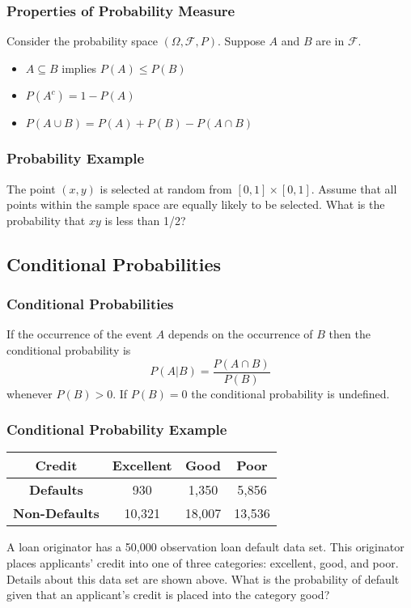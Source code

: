 \documentclass{beamer}
\begin{document}
\begin{frame}
\frametitle{Properties of Probability Measure}
Consider the probability space $(\Omega, \mathcal{F}, P)$. Suppose $A$ and $B$ are in $\mathcal{F}$.
\begin{itemize}
\item $A \subseteq B$ implies $P(A) \leq P(B)$
\item $P(A^c) = 1 - P(A)$
\item $P(A\cup B) = P(A) + P(B) - P(A\cap B)$
\end{itemize}
\end{frame}

\begin{frame}[t]
\frametitle{Probability Example}
\small
\begin{Example}
The point $(x, y)$ is selected at random from $[0, 1]\times [0, 1]$. Assume that all points within the sample space are equally likely to be selected. What is the probability that $xy$ is less than 1/2?
\end{Example}


\end{frame}

\subsection{Conditional Probabilities}

\begin{frame}
\frametitle{Conditional Probabilities}
\begin{Definition}
If the occurrence of the event $A$ depends on the occurrence of $B$ then the conditional probability is
$$
P(A | B) = \frac{P(A\cap B)}{P(B)}
$$
whenever $P(B) > 0$. If $P(B) = 0$ the conditional probability is undefined.
\end{Definition}

\end{frame}

\begin{frame}[t]
\frametitle{Conditional Probability Example}
\begin{center}
\tiny
\begin{tabular}{c | c c c}
\hline
{\bf Credit}		&	{\bf Excellent}	&	{\bf Good}	&	{\bf Poor}\\\hline
{\bf Defaults}		&	930			&	1,350	&	5,856\\
{\bf Non-Defaults}	&	10,321		&	18,007	&	13,536
\end{tabular}
\end{center}
\begin{Example}
\tiny
A loan originator has a 50,000 observation loan default data set. This originator places applicants' credit into one of three categories: excellent, good, and poor. Details about this data set are shown above. What is the probability of default given that an applicant's credit is placed into the category good?
\end{Example}
\end{frame}
\end{document}
